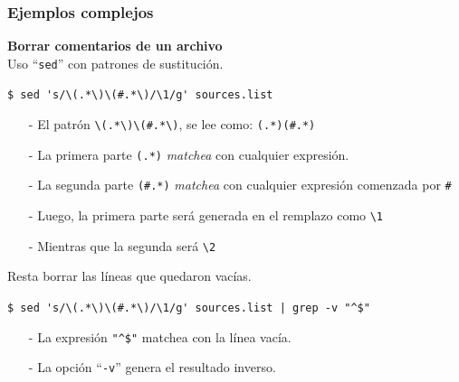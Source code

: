 \documentclass{beamer}
\begin{document}
\begin{frame}[fragile,t]
    \frametitle{\small Ejemplos complejos}
    \textbf{Borrar comentarios de un archivo}\\
    \vspace{0.4cm}
    \small \pause
    Uso ``\verb|sed|'' con patrones de sustituci\'on.
    \vspace{-0.3cm}
    \begin{block}{\vspace*{-3ex}}
    \texttt{\$}\verb; sed 's/\(.*\)\(#.*\)/\1/g' sources.list;\\
    \vspace*{0.5ex}
    \end{block}
    \vspace{-0.3cm}
    \begin{itemize}
     \item[-] El patr\'on \verb;\(.*\)\(#.*\);, se lee como: \verb;(.*)(#.*);
     \item[-] La primera parte \verb;(.*); \emph{matchea} con cualquier expresi\'on.
     \item[-] La segunda parte \verb;(#.*); \emph{matchea} con cualquier expresi\'on comenzada por \verb;#;
     \item[-] Luego, la primera parte será generada en el remplazo como \verb;\1;
     \item[-] Mientras que la segunda será \verb;\2;
    \end{itemize}
    \vspace{0.2cm}
    \small \pause
    Resta borrar las líneas que quedaron vacías.
    \vspace{-0.3cm}
    \begin{block}{\vspace*{-3ex}}
    \texttt{\$}\verb; sed 's/\(.*\)\(#.*\)/\1/g' sources.list | grep -v "^$";\\
    \vspace*{0.5ex}
    \end{block}
    \vspace{-0.3cm}
    \begin{itemize}
     \item[-] La expresi\'on \verb;"^$"; matchea con la línea vacía.
     \item[-] La opci\'on ``\verb;-v;'' genera el resultado inverso.
    \end{itemize}
\end{frame}

\begin{frame}[plain]
    \begin{center}
    \end{center}
\end{frame}
\end{document}
